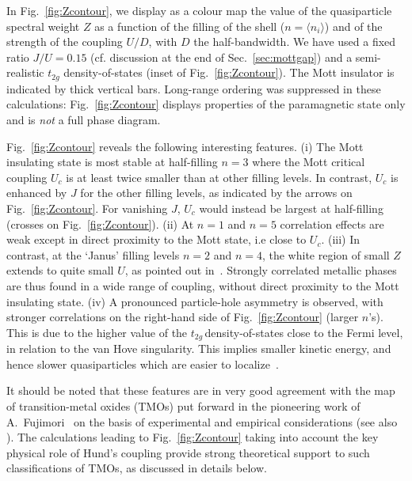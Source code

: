 \documentclass[]{ar2e-changed}%
\def\hn{\hat{n}}
\def\ttg{$t_{2g}\,$}
\begin{document}
In Fig.~\ref{fig:Zcontour},  we display as a colour map the value of the
quasiparticle spectral weight $Z$ as a function of the filling of the
shell ($n=\langle\hn_i\rangle$) and of the strength of the coupling
$U/D$, with $D$ the half-bandwidth.  %
We have used a fixed ratio $J/U=0.15$ (cf. discussion at the
end of Sec.~\ref{sec:mottgap}) and a semi-realistic $t_{2g}$ density-of-states 
(inset of Fig.~\ref{fig:Zcontour}). 
%
The Mott insulator is indicated by thick vertical bars. 
%
Long-range ordering was suppressed in these calculations:  
Fig.~\ref{fig:Zcontour} 
displays properties of the paramagnetic state only and 
is {\it not} a full phase diagram.

Fig.~\ref{fig:Zcontour} reveals the following interesting features. 
%
(i) The Mott insulating state is most stable at half-filling $n=3$ where the Mott critical coupling 
$U_c$ is at least twice smaller than at other filling levels. In contrast, $U_c$ is enhanced by 
$J$ for the other filling levels, as indicated by the arrows on Fig.~\ref{fig:Zcontour}.  
%
For vanishing $J$, $U_c$ would instead be largest at half-filling  (crosses on Fig.~\ref{fig:Zcontour}). 
%
(ii) At $n=1$ and $n=5$ correlation effects are weak except in direct proximity to the Mott state, 
i.e close to $U_c$. 
%
(iii) In contrast, at the `Janus' filling levels $n=2$ and $n=4$, the
white region of small $Z$ extends to quite small $U$, as pointed out 
in~\cite{demedici_prl_2011}. Strongly correlated metallic phases are thus found 
in a wide range of coupling, without direct proximity to the Mott insulating state. 
%
(iv) A pronounced particle-hole asymmetry is observed, with stronger correlations 
on the right-hand side of Fig.~\ref{fig:Zcontour} (larger $n$'s). 
This is due to the higher value of the \ttg density-of-states close to the Fermi level, in relation to 
the van Hove singularity. This implies smaller kinetic energy, and hence slower quasiparticles which are 
easier to localize~\cite{mravlje11}. 

It should be noted that these features are in very good agreement with the map of 
transition-metal oxides (TMOs) put forward in the pioneering work of  A.~Fujimori~\cite{fujimori_diagram_1992} 
on the basis of experimental and empirical considerations (see also \cite{imada_mit_review}). 
%
The calculations leading to Fig.~\ref{fig:Zcontour} taking into account the 
key physical role of  Hund's coupling provide strong 
theoretical support to  such classifications of TMOs, as discussed in details below.  
\end{document}
